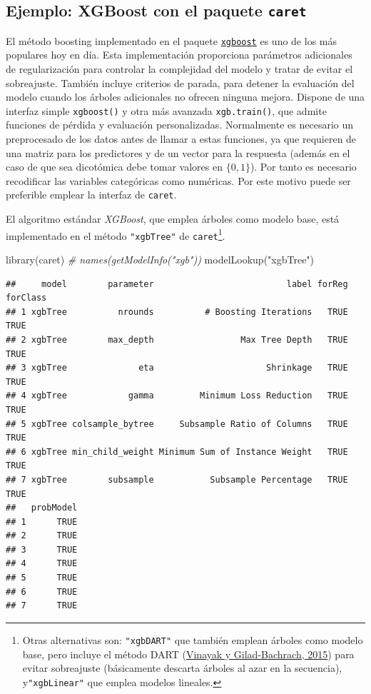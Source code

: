 \documentclass[
  spanish,
]{book}
\newenvironment{Shaded}{\begin{snugshade}}{\end{snugshade}}
\newcommand{\CommentTok}[1]{\textcolor[rgb]{0.56,0.35,0.01}{\textit{#1}}}
\newcommand{\FunctionTok}[1]{\textcolor[rgb]{0.00,0.00,0.00}{#1}}
\newcommand{\NormalTok}[1]{#1}
\newcommand{\StringTok}[1]{\textcolor[rgb]{0.31,0.60,0.02}{#1}}
\theoremstyle{break}
\theoremstyle{definition}
\theoremstyle{definition}
\theoremstyle{definition}
\theoremstyle{definition}
\theoremstyle{remark}
\begin{document}
\hypertarget{ejemplo-xgboost-con-el-paquete-caret}{%
\subsection{\texorpdfstring{Ejemplo: XGBoost con el paquete \texttt{caret}}{Ejemplo: XGBoost con el paquete caret}}\label{ejemplo-xgboost-con-el-paquete-caret}}

El método boosting implementado en el paquete \href{https://github.com/dmlc/xgboost/tree/master/R-package}{\texttt{xgboost}} es uno de los más populares hoy en día.
Esta implementación proporciona parámetros adicionales de regularización para controlar la complejidad del modelo y tratar de evitar el sobreajuste.
También incluye criterios de parada, para detener la evaluación del modelo cuando los árboles adicionales no ofrecen ninguna mejora.
Dispone de una interfaz simple \texttt{xgboost()} y otra más avanzada \texttt{xgb.train()}, que admite funciones de pérdida y evaluación personalizadas.
Normalmente es necesario un preprocesado de los datos antes de llamar a estas funciones, ya que requieren de una matriz para los predictores y de un vector para la respuesta (además en el caso de que sea dicotómica debe tomar valores en \(\{0, 1\}\)). Por tanto es necesario recodificar las variables categóricas como numéricas.
Por este motivo puede ser preferible emplear la interfaz de \texttt{caret}.

El algoritmo estándar \emph{XGBoost}, que emplea árboles como modelo base, está implementado en el método \texttt{"xgbTree"} de \texttt{caret}\footnote{Otras alternativas son: \texttt{"xgbDART"} que también emplean árboles como modelo base, pero incluye el método DART (\protect\hyperlink{ref-vinayak2015dart}{Vinayak y Gilad-Bachrach, 2015}) para evitar sobreajuste (básicamente descarta árboles al azar en la secuencia), y\texttt{"xgbLinear"} que emplea modelos lineales.}.

\begin{Shaded}
\begin{Highlighting}[]
\FunctionTok{library}\NormalTok{(caret)}
\CommentTok{\# names(getModelInfo("xgb"))}
\FunctionTok{modelLookup}\NormalTok{(}\StringTok{"xgbTree"}\NormalTok{)}
\end{Highlighting}
\end{Shaded}

\begin{verbatim}
##     model        parameter                          label forReg forClass
## 1 xgbTree          nrounds          # Boosting Iterations   TRUE     TRUE
## 2 xgbTree        max_depth                 Max Tree Depth   TRUE     TRUE
## 3 xgbTree              eta                      Shrinkage   TRUE     TRUE
## 4 xgbTree            gamma         Minimum Loss Reduction   TRUE     TRUE
## 5 xgbTree colsample_bytree     Subsample Ratio of Columns   TRUE     TRUE
## 6 xgbTree min_child_weight Minimum Sum of Instance Weight   TRUE     TRUE
## 7 xgbTree        subsample           Subsample Percentage   TRUE     TRUE
##   probModel
## 1      TRUE
## 2      TRUE
## 3      TRUE
## 4      TRUE
## 5      TRUE
## 6      TRUE
## 7      TRUE
\end{verbatim}
\end{document}

